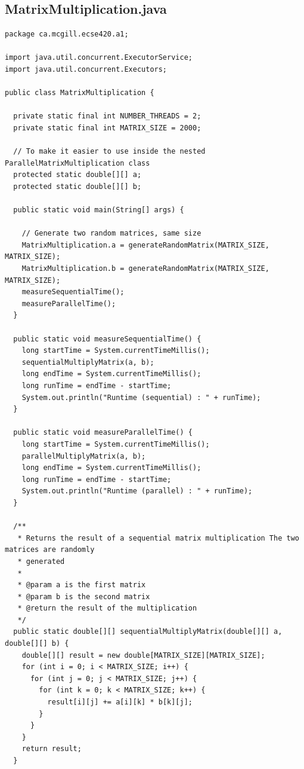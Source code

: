 \documentclass[11pt,letterpaper]{exam}
\begin{document}
\subsection*{MatrixMultiplication.java}
\begin{lstlisting}
package ca.mcgill.ecse420.a1;

import java.util.concurrent.ExecutorService;
import java.util.concurrent.Executors;

public class MatrixMultiplication {

  private static final int NUMBER_THREADS = 2;
  private static final int MATRIX_SIZE = 2000;

  // To make it easier to use inside the nested ParallelMatrixMultiplication class
  protected static double[][] a;
  protected static double[][] b;

  public static void main(String[] args) {

    // Generate two random matrices, same size
    MatrixMultiplication.a = generateRandomMatrix(MATRIX_SIZE, MATRIX_SIZE);
    MatrixMultiplication.b = generateRandomMatrix(MATRIX_SIZE, MATRIX_SIZE);
    measureSequentialTime();
    measureParallelTime();
  }

  public static void measureSequentialTime() {
    long startTime = System.currentTimeMillis();
    sequentialMultiplyMatrix(a, b);
    long endTime = System.currentTimeMillis();
    long runTime = endTime - startTime;
    System.out.println("Runtime (sequential) : " + runTime);
  }

  public static void measureParallelTime() {
    long startTime = System.currentTimeMillis();
    parallelMultiplyMatrix(a, b);
    long endTime = System.currentTimeMillis();
    long runTime = endTime - startTime;
    System.out.println("Runtime (parallel) : " + runTime);
  }

  /**
   * Returns the result of a sequential matrix multiplication The two matrices are randomly
   * generated
   *
   * @param a is the first matrix
   * @param b is the second matrix
   * @return the result of the multiplication
   */
  public static double[][] sequentialMultiplyMatrix(double[][] a, double[][] b) {
    double[][] result = new double[MATRIX_SIZE][MATRIX_SIZE];
    for (int i = 0; i < MATRIX_SIZE; i++) {
      for (int j = 0; j < MATRIX_SIZE; j++) {
        for (int k = 0; k < MATRIX_SIZE; k++) {
          result[i][j] += a[i][k] * b[k][j];
        }
      }
    }
    return result;
  }


\end{lstlisting}
\end{document}
